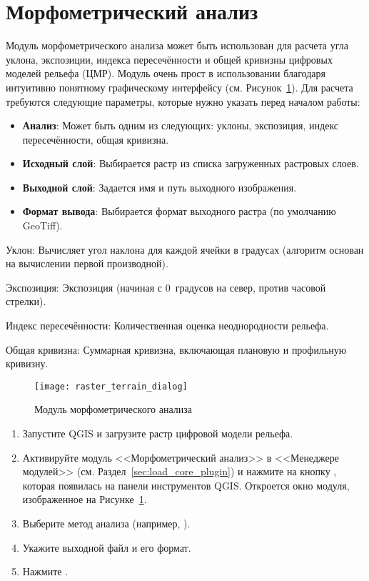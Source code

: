 
\section{Морфометрический анализ}


Модуль морфометрического анализа  может быть использован для расчета
угла уклона, экспозиции, индекса пересечённости и общей кривизны цифровых
моделей рельефа (ЦМР). Модуль очень прост в использовании благодаря
интуитивно понятному графическому интерфейсу
(см. Рисунок~\ref{fig:raster_terrain_dialog}). Для расчета требуются
следующие параметры, которые нужно указать перед началом работы:

\begin{itemize}[label=--]
\item \textbf{Анализ}: Может быть одним из следующих: уклоны,
экспозиция, индекс пересечённости, общая кривизна.
\item \textbf{Исходный слой}: Выбирается растр из списка загруженных растровых
слоев.
\item \textbf{Выходной слой}: Задается имя и путь выходного изображения.
\item \textbf{Формат вывода}: Выбирается формат выходного растра (по
умолчанию GeoTiff).
\end{itemize}

Уклон: Вычисляет угол наклона для каждой ячейки в градусах (алгоритм
основан на вычислении первой производной).

Экспозиция: Экспозиция (начиная с 0~градусов на север, против часовой стрелки).

Индекс пересечённости: Количественная оценка неоднородности рельефа.

Общая кривизна: Суммарная кривизна, включающая плановую и профильную кривизну.

\begin{figure}[ht]
   \centering
   \texttt{[image: raster\_terrain\_dialog]}
   \caption{Модуль морфометрического анализа \nixcaption}\label{fig:raster_terrain_dialog}
\end{figure}

\label{raster_terrain_usage}

\begin{enumerate}
  \item Запустите QGIS и загрузите растр цифровой модели рельефа.
  \item Активируйте модуль <<Морфометрический анализ>> в <<Менеджере модулей>>
  (см. Раздел~\ref{sec:load_core_plugin}) и нажмите на кнопку
  , которая появилась
  на панели инструментов QGIS. Откроется окно модуля, изображенное на
  Рисунке~\ref{fig:raster_terrain_dialog}.
  \item Выберите метод анализа (например, ).
  \item Укажите выходной файл и его формат.
  \item Нажмите .
\end{enumerate}

\FloatBarrier
